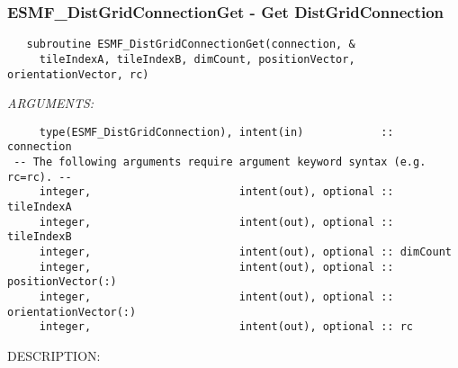  
\setlength{\oldparskip}{\parskip}
\setlength{\parskip}{1.5ex}
\setlength{\oldparindent}{\parindent}
\setlength{\parindent}{0pt}
\setlength{\oldbaselineskip}{\baselineskip}
\setlength{\baselineskip}{11pt}
 
\def\bv{\begin{verbatim}}
\def\ev{\end{verbatim}}
\def\be{\begin{equation}}
\def\ee{\end{equation}}
\def\bea{\begin{eqnarray}}
\def\eea{\end{eqnarray}}
\def\bi{\begin{itemize}}
\def\ei{\end{itemize}}
\def\bn{\begin{enumerate}}
\def\en{\end{enumerate}}
\def\bd{\begin{description}}
\def\ed{\end{description}}
\def\({\left (}
\def\){\right )}
\def\[{\left [}
\def\]{\right ]}
\def\<{\left  \langle}
\def\>{\right \rangle}
\def\cI{{\cal I}}
\def\diag{\mathop{\rm diag}}
\def\tr{\mathop{\rm tr}}


 
\subsubsection [ESMF\_DistGridConnectionGet] {ESMF\_DistGridConnectionGet - Get DistGridConnection}


\begin{verbatim}   subroutine ESMF_DistGridConnectionGet(connection, &
     tileIndexA, tileIndexB, dimCount, positionVector, orientationVector, rc)\end{verbatim}{\em ARGUMENTS:}
\begin{verbatim}     type(ESMF_DistGridConnection), intent(in)            :: connection
 -- The following arguments require argument keyword syntax (e.g. rc=rc). --
     integer,                       intent(out), optional :: tileIndexA
     integer,                       intent(out), optional :: tileIndexB
     integer,                       intent(out), optional :: dimCount
     integer,                       intent(out), optional :: positionVector(:)
     integer,                       intent(out), optional :: orientationVector(:)
     integer,                       intent(out), optional :: rc\end{verbatim}
{\sf DESCRIPTION:\\ }


